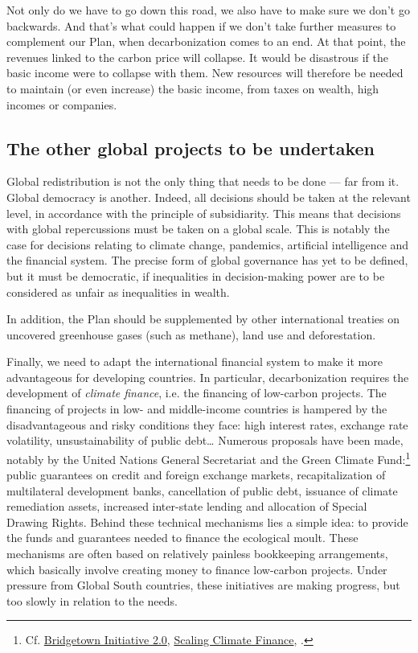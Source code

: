 \documentclass[a5paper,english,openany]{memoir}
\begin{document}
Not only do we have to go down this road, we also have to make sure we don't go backwards. And that's what could happen if we don't take further measures to complement our Plan, when decarbonization comes to an end. %
At that point, the revenues linked to the carbon price will collapse. It would be disastrous if the basic income were to collapse with them. New resources will therefore be needed to maintain (or even increase) the basic income, 
from taxes on wealth, high incomes or companies. 

\subsection{The other global projects to be undertaken}
Global redistribution is not the only thing that needs to be done --- far from it. Global democracy is another. %
Indeed, all decisions should be taken at the relevant level, in accordance with the principle of subsidiarity. This means that decisions with global repercussions must be taken on a global scale. %
This is notably the case for decisions relating to climate change, pandemics, artificial intelligence and the financial system. %
The precise form of global governance has yet to be defined, but it must be democratic, if inequalities in decision-making power are to be considered as unfair as inequalities in wealth. %

In addition, the Plan should be supplemented by other international treaties on uncovered greenhouse gases (such as methane), land use and deforestation. 

Finally, we need to adapt the international financial system to make it more advantageous for developing countries. In particular, decarbonization requires the development of \textit{climate finance}, i.e. the financing of low-carbon projects. The financing of projects in low- and middle-income countries is hampered by the disadvantageous and risky conditions they face: high interest rates, exchange rate volatility, unsustainability of public debt\dots{} Numerous proposals have been made, notably by the United Nations General Secretariat and the Green Climate Fund:\footnote{Cf. \href{https://www.un.org/sustainabledevelopment/blog/2023/04/press-release-with-clock-ticking-for-the-sdgs-un-chief-and-barbados-prime-minister-call-for-urgent-action-to-transform-broken-global-financial-system/}{Bridgetown Initiative 2.0}, \href{https://www.greenclimate.fund/sites/default/files/document/scaling-climate-finance-context-covid-19-full-report\_0.pdf}{Scaling Climate Finance}, \citet{hourcade_accelerating_2021}.} public guarantees on credit and foreign exchange markets, recapitalization of multilateral development banks, cancellation of public debt, issuance of climate remediation assets, increased inter-state lending and allocation of Special Drawing Rights. Behind these technical mechanisms lies a simple idea: to provide the funds and guarantees needed to finance the ecological moult. These mechanisms are often based on relatively painless bookkeeping arrangements, which basically involve creating money to finance low-carbon projects. Under pressure from Global South countries, these initiatives are making progress, but too slowly in relation to the needs.
\end{document}
